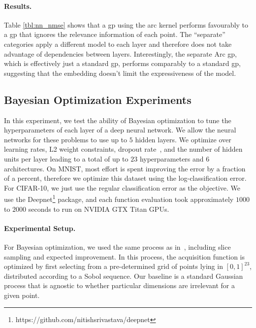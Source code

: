 \documentclass{article}
\newcommand{\gp}{{\sc gp}}
\begin{document}
\paragraph{Results.}
Table \ref{tbl:nn_nmse} shows that a \gp{} using the arc kernel performs favourably to a \gp{} that ignores the relevance information of each point. The ``separate'' categories apply a different model to each layer and therefore does not take advantage of dependencies between layers. Interestingly, the separate Arc \gp{}, which is effectively just a standard \gp{}, performs comparably to a standard \gp{}, suggesting that the embedding doesn't limit the expressiveness of the model.

\subsection{Bayesian Optimization Experiments}  
\vspace{-0.05in} 
In this experiment, we test the ability of Bayesian optimization to tune the hyperparameters of each layer of a deep neural network. We allow the neural networks for these problems to use up to $5$ hidden layers. We optimize over learning rates, L2 weight constraints, dropout rate~\cite{hinton2012improving}, and the number of hidden units per layer leading to a total of up to $23$ hyperparameters and $6$ architectures. On MNIST, most effort is spent improving the error by a fraction of a percent, therefore we optimize this dataset using the log-classification error. For CIFAR-10, we just use the regular classification error as the objective. We use the Deepnet\footnote{https://github.com/nitishsrivastava/deepnet} package, and each function evaluation took approximately $1000$ to $2000$ seconds to run on NVIDIA GTX Titan GPUs.
\paragraph{Experimental Setup.}
For Bayesian optimization, we used the same process as in~\cite{snoek-etal-2012b}, including slice sampling and expected improvement. In this process, the acquisition function is optimized by first selecting from a pre-determined grid of points lying in $[0,1]^{23}$, distributed according to a Sobol sequence. Our baseline is a standard Gaussian process that is agnostic to whether particular dimensions are irrelevant for a given point.
\end{document}
